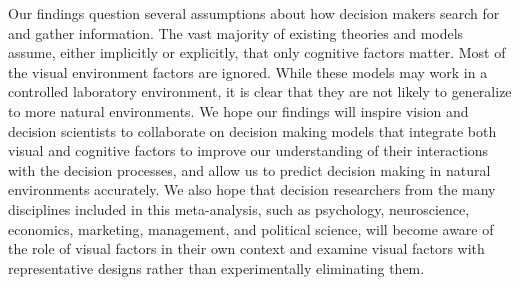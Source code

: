 Our findings question several assumptions about how decision makers search for and gather information. The vast majority of existing theories and models assume, either implicitly or explicitly, that only cognitive factors matter. Most of the visual environment factors are ignored. While these models may work in a controlled laboratory environment, it is clear that they are not likely to generalize to more natural environments. We hope our findings will inspire vision and decision scientists to collaborate on decision making models that integrate both visual and cognitive factors to improve our understanding of their interactions with the decision processes, and allow us to predict decision making in natural environments accurately. We also hope that decision researchers from the many disciplines included in this meta-analysis, such as psychology, neuroscience, economics, marketing, management, and political science, will become aware of the role of visual factors in their own context and examine visual factors with representative designs rather than experimentally eliminating them.
